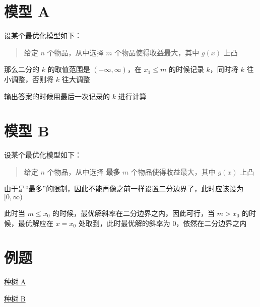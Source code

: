 \documentclass[UTF8]{article}
\begin{document}
\section{模型 A}

设某个最优化模型如下：

\begin{quotation}

给定 $n$ 个物品，从中选择 $m$ 个物品使得收益最大，其中 $g(x)$ 上凸

\end{quotation}

那么二分的 $k$ 的取值范围是 $(-\infty, \infty)$，在 $x_1 \le m$ 的时候记录 $k$，同时将 $k$ 往小调整，否则将 $k$ 往大调整

输出答案的时候用最后一次记录的 $k$ 进行计算

\section{模型 B}

设某个最优化模型如下：

\begin{quotation}

给定 $n$ 个物品，从中选择 \textbf{最多} $m$ 个物品使得收益最大，其中 $g(x)$ 上凸

\end{quotation}

由于是“最多”的限制，因此不能再像之前一样设置二分边界了，此时应该设为 $[0, \infty)$

此时当 $m \le x_0$ 的时候，最优解斜率在二分边界之内，因此可行，当 $m > x_0$ 的时候，最优解应在 $x=x_0$ 处取到，此时最优解的斜率为 $0$，依然在二分边界之内

\section{例题}

\href{https://www.luogu.org/problemnew/show/P1792}{种树 A}

\href{https://www.luogu.org/problemnew/show/P1484}{种树 B}
\end{document}
